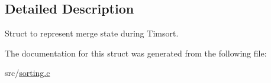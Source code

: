 \subsection{Detailed Description}
Struct to represent merge state during Timsort. 

The documentation for this struct was generated from the following file\+:\begin{DoxyCompactItemize}
\item 
src/\hyperlink{sorting_8c}{sorting.\+c}\end{DoxyCompactItemize}
